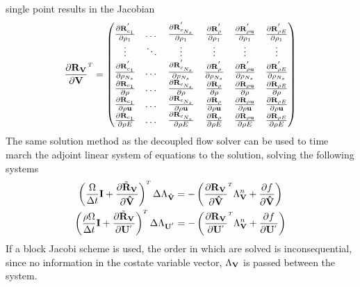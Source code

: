 single point results in the Jacobian
\begin{gather}
  \drvdv = 
  \begin{pmatrix}
    \tpdiff{\rho_1}{c_1}      & \dots  & \tpdiff{\rho_1}{c_{N_s}}     & \tpdiff{\rho_1}{\rho}     & \tpdiff{\rho_1}{\rho \vu}     &  \tpdiff{\rho_1}{\rho E}  \\
    \vdots                    & \ddots & \vdots                       & \vdots                    & \vdots                        & \vdots                    \\
    \tpdiff{\rho_{N_s}}{c_1}  & \dots  & \tpdiff{\rho_{N_s}}{c_{N_s}} & \tpdiff{\rho_{N_s}}{\rho} & \tpdiff{\rho_{N_s}}{\rho \vu} &  \tpdiff{\rho_{N_s}}{\rho E}    \\
    \tdiff{\rho}{c_1}         & \dots  & \tdiff{\rho}{c_{N_s}}        & \tdiff{\rho}{\rho}        & \tdiff{\rho}{\rho \vu}        &  \tdiff{\rho}{\rho E}     \\
    \tdiff{\rho \vu}{c_1}     & \dots  & \tdiff{\rho \vu}{c_{N_s}}    & \tdiff{\rho \vu}{\rho}    & \tdiff{\rho \vu}{\rho \vu}    &  \tdiff{\rho \vu}{\rho E} \\
    \tdiff{\rho E}{c_1}       & \dots  & \tdiff{\rho E}{c_{N_s}}      & \tdiff{\rho E}{\rho}      & \tdiff{\rho E}{\rho \vu}      &  \tdiff{\rho E}{\rho E}
  \end{pmatrix}
  \label{dc-full-system}
\end{gather}
The same solution method as the decoupled flow solver can be used to time march
the adjoint linear system of equations to the solution, solving the following
systems
\begin{gather}
  \left(
  \frac{\vol}{\Delta t} \mi + \pd{\tilde{\vR}_{\mv}}{\Vhat}
  \right)^{\mathsmaller T} \Delta \adjlam{\Vhat}
  =
  -\left(\pd{\rv{}}{\Vhat}^{\mathsmaller T}\adjlam{\mv}^n + \pd{f}{\Vhat} \right)
  \label{dc-species-adj-time} \\
  \left(
  \frac{\rho \vol}{\Delta t} \mi + \pd{\tilde{\vR}_{\mv}}{\Up}
  \right)^{\mathsmaller T} \Delta \adjlam{\Up}
  =
  -\left(\pd{\rv{}}{\Up}^{\mathsmaller T}\adjlam{\mv}^n + \pd{f}{\Up} \right)
  \label{dc-mixture-adj-time}
\end{gather}
If a block Jacobi scheme is used, the order in which
 are solved is inconsequential,
since no information in the costate variable vector, $\Lambda_{\mathbf V}$ is passed
between the system.

